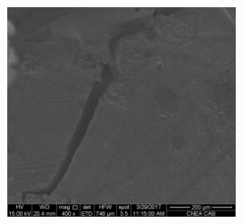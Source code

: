 \documentclass[usenames,dvipsnames]{beamer}
\begin{document}
\begin{frame}
\begin{columns}
\includegraphics[width=0.5\textwidth]{img/intro/EsponjaA_005.jpg}

\end{columns}

\end{frame}



\end{document}
